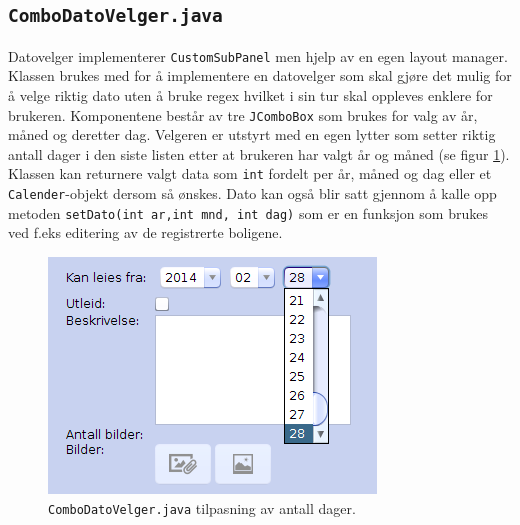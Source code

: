 \subsection{\texttt{ComboDatoVelger.java}}
Datovelger implementerer \texttt{CustomSubPanel} men hjelp av en egen layout manager. Klassen brukes med for å implementere en datovelger som skal gjøre det mulig for å velge riktig dato uten å bruke regex hvilket i sin tur skal oppleves enklere for brukeren. Komponentene består av tre \texttt{JComboBox} som brukes for valg av år, måned og deretter dag. Velgeren er utstyrt med en egen lytter som setter riktig antall dager i den siste listen etter at brukeren har valgt år og måned (se figur \ref{fig:combo_datovelger}).
Klassen kan returnere valgt data som \texttt{int} fordelt per år, måned og dag eller et \texttt{Calender}-objekt dersom så ønskes. Dato kan også blir satt gjennom å kalle opp metoden \texttt{setDato(int ar,int mnd, int dag)} som  er en funksjon som brukes ved f.eks editering av de registrerte boligene. 


\begin{figure}[ht]
\center
 \includegraphics[scale=0.5]{./img/produktdokumentasjon/swing_componenter/combo_datovelger.png}
 \caption{\texttt{ComboDatoVelger.java} tilpasning av antall dager.}
 \label{fig:combo_datovelger}
\end{figure}


